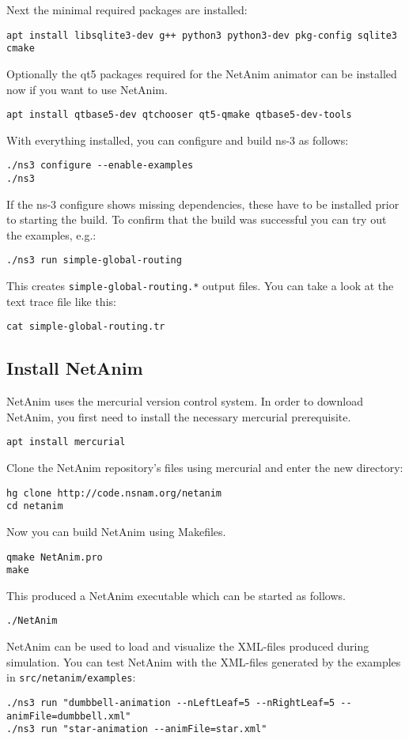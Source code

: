 Next the minimal required packages are installed:
\begin{verbatim}
apt install libsqlite3-dev g++ python3 python3-dev pkg-config sqlite3 cmake
\end{verbatim}
Optionally the qt5 packages required for the NetAnim animator can be installed now if you want to use NetAnim.
\begin{verbatim}
apt install qtbase5-dev qtchooser qt5-qmake qtbase5-dev-tools
\end{verbatim}
With everything installed, you can configure and build ns-3 as follows:
\begin{verbatim}
./ns3 configure --enable-examples
./ns3
\end{verbatim}
If the ns-3 configure shows missing dependencies, these have to be installed prior to starting the build.  
To confirm that the build was successful you can try out the examples, e.g.:
\begin{verbatim}
./ns3 run simple-global-routing
\end{verbatim}
This creates \texttt{simple-global-routing.*} output files. You can take a look at the text trace file like this:
\begin{verbatim}
cat simple-global-routing.tr
\end{verbatim}

\subsection{Install NetAnim}
NetAnim uses the mercurial version control system. In order to download NetAnim, you first need to install the necessary mercurial prerequisite.
\begin{verbatim}
apt install mercurial
\end{verbatim}
Clone the NetAnim repository's files using mercurial and enter the new directory:
\begin{verbatim}
hg clone http://code.nsnam.org/netanim
cd netanim
\end{verbatim}
Now you can build NetAnim using Makefiles.
\begin{verbatim}
qmake NetAnim.pro
make
\end{verbatim}
This produced a NetAnim executable which can be started as follows.
\begin{verbatim}
./NetAnim
\end{verbatim}
NetAnim can be used to load and visualize the XML-files produced during simulation.  
You can test NetAnim with the XML-files generated by the examples in \texttt{src/netanim/examples}:
\begin{verbatim}
./ns3 run "dumbbell-animation --nLeftLeaf=5 --nRightLeaf=5 --animFile=dumbbell.xml"
./ns3 run "star-animation --animFile=star.xml"
\end{verbatim}

